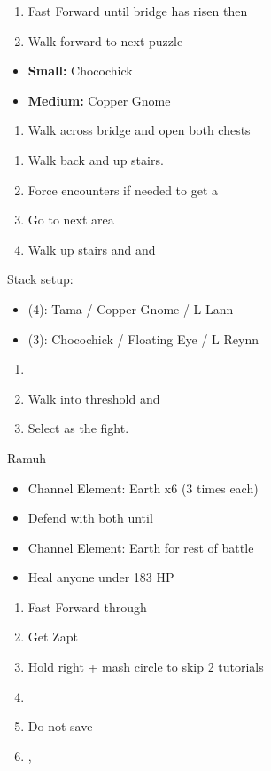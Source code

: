 \begin{enumerate}[resume]
	\item Fast Forward until bridge has risen then \cs%
	\item Walk forward to next puzzle
\end{enumerate}
\begin{puzzle}
	\begin{itemize}
		\item \textbf{Small:} Chocochick
		\item \textbf{Medium:} Copper Gnome
	\end{itemize}
\end{puzzle}
\begin{enumerate}[resume]
	\item Walk across bridge and open both chests
\end{enumerate}
\begin{enumerate}[resume]
	\item Walk back and up stairs. 
	\item Force encounters if needed to get a 
	\item Go to next area
	\item Walk up stairs and  and \cs\
\end{enumerate}
\begin{menu}
    Stack setup:
    \begin{itemize}
        \item (4): Tama / Copper Gnome  / L Lann
        \item (3): Chocochick / Floating Eye / L Reynn
    \end{itemize}
\end{menu}
\begin{enumerate}[resume]
	\item \save\
	\item Walk into threshold and \cs\
	\item Select  as the fight.
\end{enumerate}
\begin{battle}[2562]{Ramuh}
	\begin{itemize}
		\item Channel Element: Earth x6 (3 times each)
		\item Defend with both until 
		\item Channel Element: Earth for rest of battle
		\item Heal anyone under 183 HP
	\end{itemize}
\end{battle}
\begin{enumerate}[resume]
	\item Fast Forward through \unskippablecs\
	\item Get Zapt
	\item Hold right + mash circle to skip 2 tutorials
	\item \cs\
	\item Do not save
	\item \travel{Nine Woods Hiil}, 
\end{enumerate}